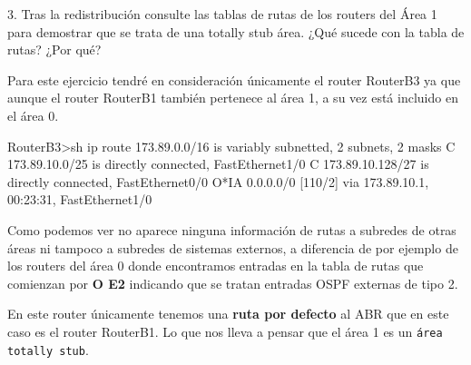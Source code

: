 \begin{ejer}
3. Tras la redistribución consulte las tablas de rutas de los routers del Área 1 para demostrar que se trata de una totally stub área. ¿Qué sucede con la tabla de rutas? ¿Por qué?
\end{ejer}
\par Para este ejercicio tendré en consideración únicamente el router RouterB3 ya que aunque el router RouterB1 también pertenece al área 1, a su vez está incluido en el área 0.
\begin{listing}[style=consola]
RouterB3>sh ip route
     173.89.0.0/16 is variably subnetted, 2 subnets, 2 masks
C       173.89.10.0/25 is directly connected, FastEthernet1/0
C       173.89.10.128/27 is directly connected, FastEthernet0/0
O*IA 0.0.0.0/0 [110/2] via 173.89.10.1, 00:23:31, FastEthernet1/0
\end{listing}
\par Como podemos ver no aparece ninguna información de rutas a subredes de otras áreas ni tampoco a subredes de sistemas externos, a diferencia de por ejemplo de los routers del área 0 donde encontramos entradas en la tabla de rutas que comienzan por \textbf{O E2} indicando que se tratan entradas OSPF externas de tipo 2.
\par En este router únicamente tenemos una \textbf{ruta por defecto} al ABR que en este caso es el router RouterB1. Lo que nos lleva a pensar que el área 1 es un \texttt{área totally stub}.
